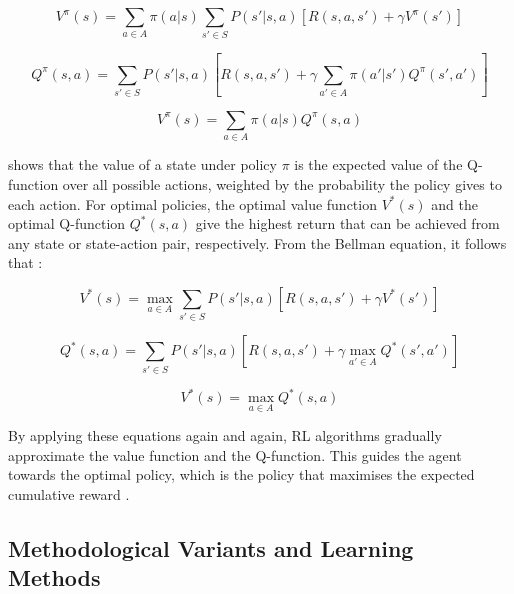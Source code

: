 \begin{equation}
V^\pi(s) = \sum_{a \in A} \pi(a|s) \sum_{s' \in S} P(s'|s,a) \left[ R(s,a,s') + \gamma V^\pi(s') \right]
\end{equation}

\begin{equation}
Q^\pi(s, a) = \sum_{s' \in S} P(s'|s,a) \left[ R(s,a,s') + \gamma \sum_{a' \in A} \pi(a'|s') Q^\pi(s', a') \right]
\end{equation}

\begin{equation}
\label{Equation:RelationshipValueQFunction}
V^\pi(s) = \sum_{a \in A} \pi(a|s) Q^\pi(s, a)
\end{equation}

 shows that the value of a state under policy \(\pi\) is the expected value of the Q-function over all possible actions, weighted by the probability the policy gives to each action. For optimal policies, the optimal value function \( V^*(s) \) and the optimal Q-function \( Q^*(s, a) \) give the highest return that can be achieved from any state or state-action pair, respectively. From the Bellman equation, it follows that \cite{sutton_reinforcement_2018}:

\begin{equation}
V^*(s) = \max_{a \in A} \sum_{s' \in S} P(s'|s,a) \left[ R(s,a,s') + \gamma V^*(s') \right]
\end{equation}

\begin{equation}
Q^*(s, a) = \sum_{s' \in S} P(s'|s,a) \left[ R(s,a,s') + \gamma \max_{a' \in A} Q^*(s', a') \right]
\end{equation}

\begin{equation}
V^*(s) = \max_{a \in A} Q^*(s, a)
\end{equation}

By applying these equations again and again, RL algorithms gradually approximate the value function and the Q-function. This guides the agent towards the optimal policy, which is the policy that maximises the expected cumulative reward \cite{sutton_reinforcement_2018}.

\subsection{Methodological Variants and Learning Methods}

